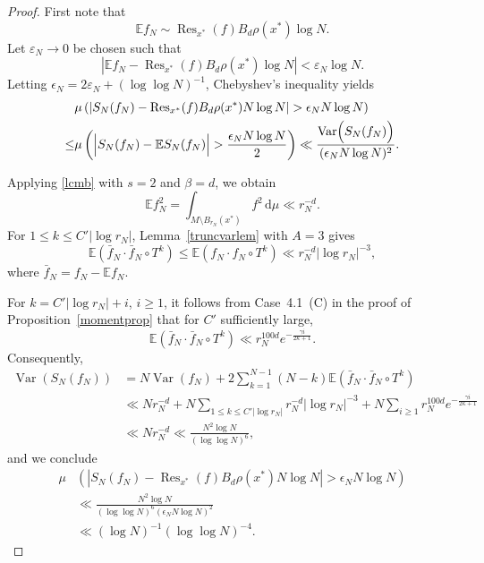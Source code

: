 \documentclass[11pt,twoside,a4paper,reqno]{amsart}
\newcommand{\Res}{\operatorname{Res}}
\newcommand{\Var}{\operatorname{Var}}
\renewcommand{\d}{\, \text{d}}
\newcommand{\E}{\mathbb{E}}
\begin{document}
\begin{proof}
First note that
$$\E f_N \sim \operatorname{Res}_{x^*}(f)B_d \rho(x^*) \log N.$$
Let $\varepsilon_N \to 0$ be chosen such that
\begin{equation}\label{Etdf}
\left|\mathbb{E}f_N- \operatorname{Res}_{x^*}(f)B_d \rho(x^*) \log N\right|<\varepsilon_N\log N.
\end{equation}
Letting $\epsilon_N=2\varepsilon_N + (\log\log N)^{-1}$, Chebyshev's inequality yields
\begin{align*}
& \mu\left( \left| S_N(f_N)- \operatorname{Res}_{x^*}(f)B_d \rho(x^*) N \log N \right| > \epsilon_N N \log N \right)\\
\leq & \mu \left( \Bigl| S_N(f_N) - \E S_N(f_N) \Bigr| > \frac{\epsilon_N N \log N}{2} \right)
\ll \frac{\Var\Bigl(S_N(f_N)\Bigr)}{(\epsilon_N N \log N)^2}.
\end{align*}

Applying \eqref{lcmb} with $s=2$ and
$\beta=d$, we obtain
$$\E f_N^2=\int_{M\setminus B_{r_N}(x^*)}f^2\d\mu\ll r_N^{-d}.
$$
For $1\le k\le C'|\log r_N|$, Lemma~\ref{truncvarlem} with
$A=3$ gives
$$\E(\bar{f}_N\cdot\bar{f}_N\circ T^k)\le \E(f_N \cdot f_N\circ T^k)\ll r_N^{-d}|\log r_N|^{-3},
$$
where $\bar{f}_N=f_N-\E f_N.$

For $k=C'|\log r_N|+i$, $i\ge1$, it follows from Case~4.1~(C) in the proof of Proposition~\ref{momentprop} that for $C'$ sufficiently large,
$$\E(\bar{f}_N\cdot\bar{f}_N\circ T^k)\ll r_N^{100d} e^{-\frac{\gamma i}{2\kappa+1}}.
$$
Consequently,
\begin{align*}
\operatorname{Var}(S_N(f_N))&=N\Var(f_N)
+2\sum_{k=1}^{N-1}(N-k)\E(\bar{f}_N\cdot\bar{f}_N\circ T^k)\\
&\ll Nr_N^{-d}+N\sum_{1\le k\le C'|\log r_N|}r_N^{-d}|\log r_N|^{-3}+N\sum_{i\ge1}
r_N^{100d}e^{-\frac{\gamma i}{2\kappa+1}}\\
&\ll Nr_N^{-d}\ll\frac{N^2 \log N}{(\log \log N)^6},
\end{align*}
and we conclude
\begin{align*}
\mu&\left(\left|S_N(f_N)- \Res_{x^*}(f)B_d \rho(x^*) N \log N\right|>\epsilon_N N \log N \right)\\
&\ll \frac{N^2 \log N}{(\log \log N)^6(\epsilon_N N \log N)^2}\\
&\ll (\log N)^{-1} (\log \log N)^{-4}.
\end{align*}
\end{proof}
\end{document}
